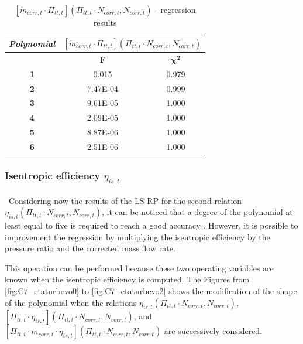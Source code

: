 \begin{longtable}[c]{@{}ccc@{}}
\caption{$[\dot{m}_{corr,t}\cdot \Pi_{tt,t}](\Pi_{tt,t}\cdot N_{corr,t},N_{corr,t})$ - regression results }
\label{tab:C7_regturb4}\\
\toprule
\textit{\textbf{Polynomial}} & \multicolumn{2}{c}{$[\dot{m}_{corr,t}\cdot \Pi_{tt,t}](\Pi_{tt,t}\cdot N_{corr,t},N_{corr,t})$} \\* \midrule
\endfirsthead
%
\endhead
%
\bottomrule
\endfoot
%
\endlastfoot
%
\multicolumn{1}{c}{\textbf{Degree}}              & \multicolumn{1}{c}{\textbf{F}}                          & \multicolumn{1}{c}{$\mathbf{\chi^2}$}                         \\
\multicolumn{1}{c}{\textbf{1}}                   & 0.015                               & 0.979                                      \\
\multicolumn{1}{c}{\textbf{2}}                   & 7.47E-04                            & 0.999                                      \\
\multicolumn{1}{c}{\textbf{3}}                   & 9.61E-05                            & 1.000                                      \\
\multicolumn{1}{c}{\textbf{4}}                   & 2.09E-05                            & 1.000                                      \\
\multicolumn{1}{c}{\textbf{5}}                   & 8.87E-06                            & 1.000                                      \\
\multicolumn{1}{c}{\textbf{6}}                   & 2.51E-06                            & 1.000                                      \\* \bottomrule
\end{longtable}


\subsubsection{Isentropic efficiency $\eta_{is,t}$}
\quad\ Considering now the results of the LS-RP for the second relation $\eta_{is,t}(\Pi_{tt,t}\cdot N_{corr,t},N_{corr,t})$, it can be noticed that a degree of the polynomial at least equal to five is required to reach a good accuracy . However, it is possible to improvement the regression by multiplying the isentropic efficiency by the pressure ratio and the corrected mass flow rate. 

This operation can be performed because these two operating variables are known when the isentropic efficiency is computed. The Figures from \ref{fig:C7_etaturbevo0} to \ref{fig:C7_etaturbevo2} shows the modification of the shape of the polynomial when the relations $\eta_{is,t}(\Pi_{tt,t}\cdot N_{corr,t},N_{corr,t})$, $[\Pi_{tt,t}\cdot\eta_{is,t}](\Pi_{tt,t}\cdot N_{corr,t},N_{corr,t})$, and $[\Pi_{tt,t}\cdot \dot{m}_{corr,t}\cdot\eta_{is,t}](\Pi_{tt,t}\cdot N_{corr,t},N_{corr,t})$ are successively considered.

